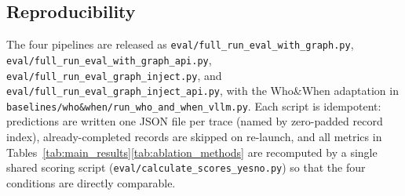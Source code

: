\subsection{Reproducibility}

The four pipelines are released as
\texttt{eval/full\_run\_eval\_with\_graph.py},
\texttt{eval/full\_run\_eval\_with\_graph\_api.py},
\texttt{eval/full\_run\_eval\_graph\_inject.py}, and
\texttt{eval/full\_run\_eval\_graph\_inject\_api.py}, with the Who\&When
adaptation in \texttt{baselines/who\&when/run\_who\_and\_when\_vllm.py}.
Each script is idempotent: predictions are written one JSON file per
trace (named by zero-padded record index), already-completed records are
skipped on re-launch, and all metrics in
Tables~\ref{tab:main_results}\textendash\ref{tab:ablation_methods} are
recomputed by a single shared scoring script
(\texttt{eval/calculate\_scores\_yesno.py}) so that the four conditions
are directly comparable.
